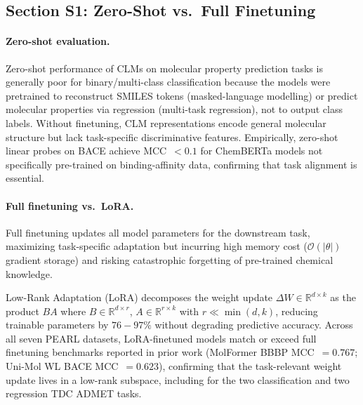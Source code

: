 \documentclass[9pt,a4paper]{article}
\begin{document}
\newpage


\subsection*{Section S1: Zero-Shot vs.\ Full Finetuning}

\paragraph{Zero-shot evaluation.}
Zero-shot performance of CLMs on molecular property prediction tasks is generally
poor for binary/multi-class classification because the models were pretrained to reconstruct SMILES tokens (masked-language modelling) or predict molecular properties via regression (multi-task regression), not to output class labels. Without finetuning, CLM representations encode general molecular structure but lack task-specific discriminative features.
Empirically, zero-shot linear probes on BACE achieve MCC~$< 0.1$ for
ChemBERTa models not specifically pre-trained on binding-affinity data, confirming that task alignment is essential.

\paragraph{Full finetuning vs.\ LoRA.}
Full finetuning updates all model parameters for the downstream task, maximizing task-specific adaptation but incurring high memory cost ($\mathcal{O}(|\theta|)$ gradient storage) and risking catastrophic forgetting of pre-trained chemical knowledge.

Low-Rank Adaptation (LoRA) decomposes the weight update $\Delta W \in \mathbb{R}^{d \times k}$
as the product $BA$ where $B \in \mathbb{R}^{d \times r}$, $A \in \mathbb{R}^{r \times k}$
with $r \ll \min(d, k)$, reducing trainable parameters by $76-97\%$ without degrading
predictive accuracy.
Across all seven PEARL datasets, LoRA-finetuned models match or exceed full finetuning
benchmarks reported in prior work (MolFormer BBBP MCC~$= 0.767$; Uni-Mol WL BACE
MCC~$= 0.623$), confirming that the task-relevant weight update lives in a low-rank
subspace, including for the two classification and two regression TDC ADMET tasks.
\end{document}
